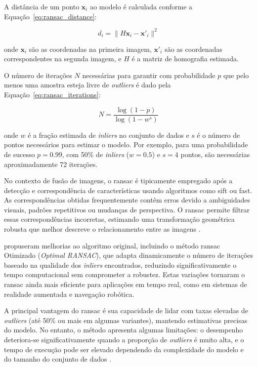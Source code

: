 A distância de um ponto $\mathbf{x}_i$ ao modelo é calculada conforme a Equação~\ref{eq:ransac_distance}:

\begin{equation}
\label{eq:ransac_distance}
d_i = \|H\mathbf{x}_i - \mathbf{x}'_i\|^2
\end{equation}

\noindent onde $\mathbf{x}_i$ são as coordenadas na primeira imagem, $\mathbf{x}'_i$ são as coordenadas correspondentes na segunda imagem, e $H$ é a matriz de homografia estimada.

O número de iterações $N$ necessárias para garantir com probabilidade $p$ que pelo menos uma amostra esteja livre de \textit{outliers} é dado pela Equação~\ref{eq:ransac_iterations}:

\begin{equation}
\label{eq:ransac_iterations}
N = \frac{\log(1-p)}{\log(1-w^s)}
\end{equation}

\noindent onde $w$ é a fração estimada de \textit{inliers} no conjunto de dados e $s$ é o número de pontos necessários para estimar o modelo. Por exemplo, para uma probabilidade de sucesso $p = 0.99$, com 50\% de \textit{inliers} ($w = 0.5$) e $s = 4$ pontos, são necessárias aproximadamente 72 iterações.

No contexto de fusão de imagens, o \gls{ransac} é tipicamente empregado após a detecção e correspondência de características usando algoritmos como \gls{sift} ou \gls{fast}. As correspondências obtidas frequentemente contêm erros devido a ambiguidades visuais, padrões repetitivos ou mudanças de perspectiva. O \gls{ransac} permite filtrar essas correspondências incorretas, estimando uma transformação geométrica robusta que melhor descreve o relacionamento entre as imagens \cite{BrownLowe2007}.

 propuseram melhorias ao algoritmo original, incluindo o método \gls{ransac} Otimizado (\textit{Optimal RANSAC}), que adapta dinamicamente o número de iterações baseado na qualidade dos \textit{inliers} encontrados, reduzindo significativamente o tempo computacional sem comprometer a robustez. Estas variações tornaram o \gls{ransac} ainda mais eficiente para aplicações em tempo real, como em sistemas de realidade aumentada e navegação robótica.

A principal vantagem do \gls{ransac} é sua capacidade de lidar com taxas elevadas de \textit{outliers} (até 50\% ou mais em algumas variantes), mantendo estimativas precisas do modelo. No entanto, o método apresenta algumas limitações: o desempenho deteriora-se significativamente quando a proporção de \textit{outliers} é muito alta, e o tempo de execução pode ser elevado dependendo da complexidade do modelo e do tamanho do conjunto de dados \cite{Hartley2003}.



